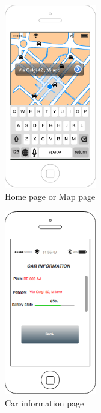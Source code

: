	\begin{figure}[H]
		\centering
		\includegraphics[height=8cm]{Resources/MapMockup.pdf}
		\caption{Home page or Map page}	
		 \label{fig:MapPage}	
	\end{figure}
	\begin{figure}[H]
		\centering
		\includegraphics[height=8cm]{Resources/CarInfo.png}
		\caption{Car information page}	
		 \label{fig:CarInfoPage}
	\end{figure}